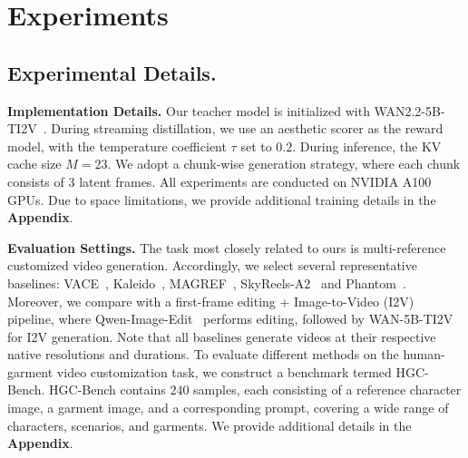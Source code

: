 \section{Experiments}

\subsection{Experimental Details.}

\noindent
\textbf{Implementation Details.}
%
Our teacher model is initialized with WAN2.2-5B-TI2V~\cite{wan2025wan}.
During streaming distillation, we use an aesthetic scorer as the reward model, with the temperature coefficient $\tau$ set to $0.2$.
% 
During inference, the KV cache size $M=23$. We adopt a chunk-wise generation strategy, where each chunk consists of $3$ latent frames.
% 
All experiments are conducted on NVIDIA A100 GPUs.
% 
Due to space limitations, we provide additional training details in the \textbf{Appendix}.


\noindent
\textbf{Evaluation Settings.}
%
The task most closely related to ours is multi-reference customized video generation. Accordingly, we select several representative baselines: VACE~\cite{vace}, Kaleido~\cite{zhang2025kaleido}, MAGREF~\cite{deng2025magref}, SkyReels-A2~\cite{fei2025skyreels} and Phantom~\cite{liu2025phantom}.
% 
Moreover, we compare with a first-frame editing + Image-to-Video (I2V) pipeline, where Qwen-Image-Edit~\cite{wu2025qwen} performs editing, followed by WAN-5B-TI2V~\cite{wan2025wan} for I2V generation.
Note that all baselines generate videos at their respective native resolutions and durations.
%
To evaluate different methods on the human-garment video customization task, we construct a benchmark termed HGC-Bench.
HGC-Bench contains $240$ samples, each consisting of a reference character image, a garment image, and a corresponding prompt, covering a wide range of characters, scenarios, and garments. We provide additional details in the \textbf{Appendix}.



